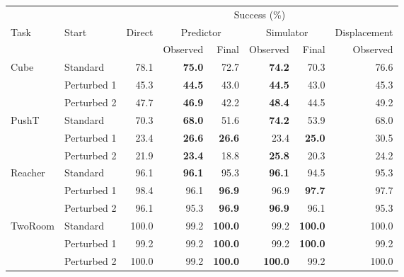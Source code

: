 \begingroup
\normalsize
\setlength{\tabcolsep}{4pt}
\begin{tabular}{@{}llrrrrrr@{}}
\toprule
 & & \multicolumn{6}{c}{Success (\%)} \\
\cmidrule(l){3-8}
Task & Start & Direct & \multicolumn{2}{c}{Predictor} & \multicolumn{2}{c}{Simulator} & Displacement \\
\cmidrule(lr){4-5}\cmidrule(lr){6-7}
 & & & Observed & Final & Observed & Final & Observed \\
\midrule
Cube & Standard & 78.1 & \textbf{75.0} & 72.7 & \textbf{74.2} & 70.3 & 76.6 \\
 & Perturbed 1 & 45.3 & \textbf{44.5} & 43.0 & \textbf{44.5} & 43.0 & 45.3 \\
 & Perturbed 2 & 47.7 & \textbf{46.9} & 42.2 & \textbf{48.4} & 44.5 & 49.2 \\
\midrule
PushT & Standard & 70.3 & \textbf{68.0} & 51.6 & \textbf{74.2} & 53.9 & 68.0 \\
 & Perturbed 1 & 23.4 & \textbf{26.6} & \textbf{26.6} & 23.4 & \textbf{25.0} & 30.5 \\
 & Perturbed 2 & 21.9 & \textbf{23.4} & 18.8 & \textbf{25.8} & 20.3 & 24.2 \\
\midrule
Reacher & Standard & 96.1 & \textbf{96.1} & 95.3 & \textbf{96.1} & 94.5 & 95.3 \\
 & Perturbed 1 & 98.4 & 96.1 & \textbf{96.9} & 96.9 & \textbf{97.7} & 97.7 \\
 & Perturbed 2 & 96.1 & 95.3 & \textbf{96.9} & \textbf{96.9} & 96.1 & 95.3 \\
\midrule
TwoRoom & Standard & 100.0 & 99.2 & \textbf{100.0} & 99.2 & \textbf{100.0} & 100.0 \\
 & Perturbed 1 & 99.2 & 99.2 & \textbf{100.0} & 99.2 & \textbf{100.0} & 99.2 \\
 & Perturbed 2 & 100.0 & 99.2 & \textbf{100.0} & \textbf{100.0} & 99.2 & 100.0 \\
\bottomrule
\end{tabular}
\endgroup

